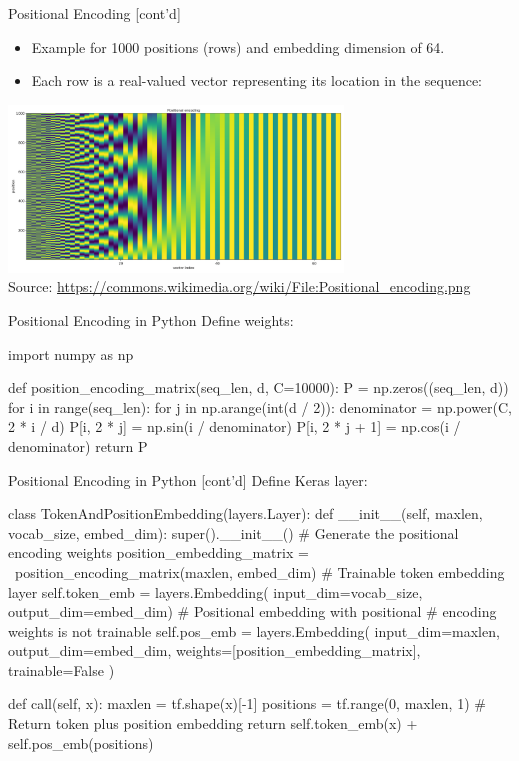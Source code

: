 \documentclass[ignorenonframetext,xcolor=x11names]{beamer}
\begin{document}
\begin{frame}{Positional Encoding \small [cont'd]}
\begin{itemize}
\item Example for 1000 positions (rows) and embedding dimension of 64. 
\item Each row is a real-valued vector representing its location in the sequence:
\end{itemize}
\begin{center}
\includegraphics[height=1.75in]{Positional_encoding.png} \\

\tiny Source: \url{https://commons.wikimedia.org/wiki/File:Positional_encoding.png} \normalsize
\end{center}
\end{frame}

\begin{frame}[fragile]{Positional Encoding in Python}
Define weights:
\begin{pythoncode}
import numpy as np

def position_encoding_matrix(seq_len, d, C=10000):
    P = np.zeros((seq_len, d))
    for i in range(seq_len):
        for j in np.arange(int(d / 2)):
            denominator = np.power(C, 2 * i / d)
            P[i, 2 * j] = np.sin(i / denominator)
            P[i, 2 * j + 1] = np.cos(i / denominator)
    return P
\end{pythoncode}
\end{frame}

\begin{frame}[fragile]{Positional Encoding in Python \small [cont'd]}
Define Keras layer:
\begin{pythoncode}
class TokenAndPositionEmbedding(layers.Layer):
    def __init__(self, maxlen, vocab_size, embed_dim):
        super().__init__()
        # Generate the positional encoding weights
        position_embedding_matrix = \
            position_encoding_matrix(maxlen, embed_dim)
        # Trainable token embedding layer
        self.token_emb = layers.Embedding(
            input_dim=vocab_size, output_dim=embed_dim)
        # Positional embedding with positional 
        # encoding weights is not trainable
        self.pos_emb = layers.Embedding(
            input_dim=maxlen, output_dim=embed_dim,
            weights=[position_embedding_matrix],
            trainable=False
        )

    def call(self, x):
        maxlen = tf.shape(x)[-1]
        positions = tf.range(0, maxlen, 1)
        # Return token plus position embedding
        return self.token_emb(x) + self.pos_emb(positions)
\end{pythoncode}
\end{frame}
\end{document}
